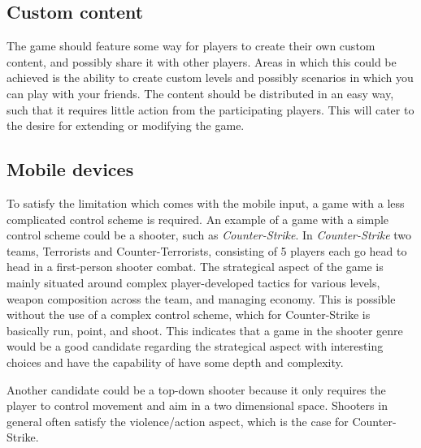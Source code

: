 \subsection{Custom content}\label{sec:selectionofgametype:customcontent}
The game should feature some way for players to create their own custom content, and possibly share it with other players. Areas in which this could be achieved is the ability to create custom levels and possibly scenarios in which you can play with your friends. The content should be distributed in an easy way, such that it requires little action from the participating players.
This will cater to the desire for extending or modifying the game.

\subsection{Mobile devices}\label{sec:selectionofgametype:mobiledevices}
To satisfy the limitation which comes with the mobile input, a game with a less complicated control scheme is required.
An example of a game with a simple control scheme could be a shooter, such as \textit{Counter-Strike}.\cite{counterstrike}
In \textit{Counter-Strike} two teams, Terrorists and Counter-Terrorists,
consisting of 5 players each go head to head in a first-person shooter combat.
The strategical aspect of the game is mainly situated around complex
player-developed tactics for various levels, weapon composition across the
team, and managing economy. This is possible without the use of a complex
control scheme, which for Counter-Strike is basically run, point, and shoot.
This indicates that a game in the shooter genre would
be a good candidate regarding the strategical aspect with interesting choices
and have the capability of have some depth and complexity.

Another candidate could be a top-down shooter because it only requires the
player to control movement and aim in a two dimensional space. Shooters in
general often satisfy the violence/action aspect, which is the case for
Counter-Strike.

